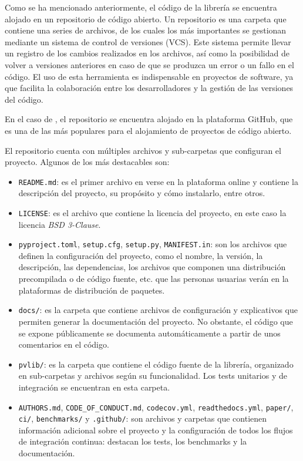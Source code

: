 Como se ha mencionado anteriormente, el código de la librería \pvlibpy{} se encuentra alojado en un \gls{repositorio} de código abierto. Un repositorio es una carpeta que contiene una series de archivos, de los cuales los más importantes se gestionan mediante un sistema de control de versiones (\gls{VCS}). Este sistema permite llevar un registro de los cambios realizados en los archivos, así como la posibilidad de volver a versiones anteriores en caso de que se produzca un error o un fallo en el código. El uso de esta herramienta es indispensable en proyectos de software, ya que facilita la colaboración entre los desarrolladores y la gestión de las versiones del código.

En el caso de \pvlibpy{}, el repositorio se encuentra alojado en la plataforma GitHub, que es una de las más populares para el alojamiento de proyectos de código abierto.

El repositorio cuenta con múltiples archivos y sub-carpetas que configuran el proyecto. Algunos de los más destacables son:

\begin{itemize}
    \item \texttt{README.md}: es el primer archivo en verse en la plataforma online y contiene la descripción del proyecto, su propósito y cómo instalarlo, entre otros.
    \item \texttt{LICENSE}: es el archivo que contiene la \gls{licencia} del proyecto, en este caso la licencia \textit{BSD 3-Clause}.
    \item \texttt{pyproject.toml}, \texttt{setup.cfg}, \texttt{setup.py}, \texttt{MANIFEST.in}: son los archivos que definen la configuración del proyecto, como el nombre, la versión, la descripción, las dependencias, los archivos que componen una distribución precompilada o de código fuente, etc. que las personas usuarias verán en la plataformas de distribución de paquetes.
    \item \texttt{docs/}: es la carpeta que contiene archivos de configuración y explicativos que permiten generar la documentación del proyecto. No obstante, el código que se expone públicamente se documenta automáticamente a partir de unos comentarios en el código.
    \item \texttt{pvlib/}: es la carpeta que contiene el código fuente de la librería, organizado en sub-carpetas y archivos según su funcionalidad. Los tests unitarios y de integración se encuentran en esta carpeta.
    \item \texttt{AUTHORS.md}, \texttt{CODE\_OF\_CONDUCT.md}, \texttt{codecov.yml}, \texttt{readthedocs.yml}, \texttt{paper/}, \texttt{ci/}, \texttt{benchmarks/} y \texttt{.github/}: son archivos y carpetas que contienen información adicional sobre el proyecto y la configuración de todos los flujos de integración continua: destacan los tests, los benchmarks y la documentación.

\end{itemize}

